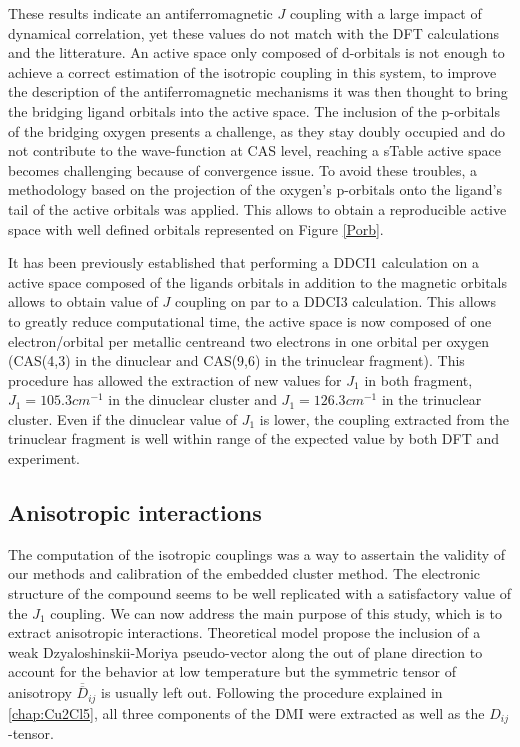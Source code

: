 \documentclass[12pt]{report}
\numberwithin{equation}{section}
\begin{document}
These results indicate an antiferromagnetic $J$ coupling with a large impact of dynamical correlation, yet these values do not match with the DFT calculations and the litterature.
An active space only composed of d-orbitals is not enough to achieve a correct estimation of the isotropic coupling in this system, to improve the description of the antiferromagnetic mechanisms it was then thought to bring the bridging ligand orbitals into the active space.
The inclusion of the p-orbitals of the bridging oxygen presents a challenge, as they stay doubly occupied and do not contribute to the wave-function at CAS level, reaching a sTable active space becomes challenging because of convergence issue.
To avoid these troubles, a methodology based on the projection of the oxygen's p-orbitals onto the ligand's tail of the active orbitals was applied.
This allows to obtain a reproducible active space with well defined orbitals represented on Figure \ref{Porb}.

It has been previously established that performing a DDCI1 calculation on a active space composed of the ligands orbitals in addition to the magnetic orbitals allows to obtain value of $J$ coupling on par to a DDCI3 calculation.
This allows to greatly reduce computational time, the active space is now composed of one electron/orbital per metallic centreand two electrons in one orbital per oxygen (CAS(4,3) in the dinuclear and CAS(9,6) in the trinuclear fragment).
This procedure has allowed the extraction of new values for $J_1$ in both fragment, $J_1=105.3 cm^{-1}$ in the dinuclear cluster and $J_1=126.3 cm^{-1}$ in the trinuclear cluster.
Even if the dinuclear value of $J_1$ is lower, the coupling extracted from the trinuclear fragment is well within range of the expected value by both DFT and experiment.




\subsection{Anisotropic interactions}

The computation of the isotropic couplings was a way to assertain the validity of our methods and calibration of the embedded cluster method.
The electronic structure of the compound seems to be well replicated with a satisfactory value of the $J_1$ coupling.
We can now address the main purpose of this study, which is to extract anisotropic interactions.
Theoretical model propose the inclusion of a weak Dzyaloshinskii-Moriya pseudo-vector along the out of plane direction to account for the behavior at low temperature but the symmetric tensor of anisotropy $\overline{\overline{D}}_{ij}$ is usually left out.
Following the procedure explained in \ref{chap:Cu2Cl5}, all three components of the DMI were extracted as well as the $D_{ij}$-tensor.
\end{document}
